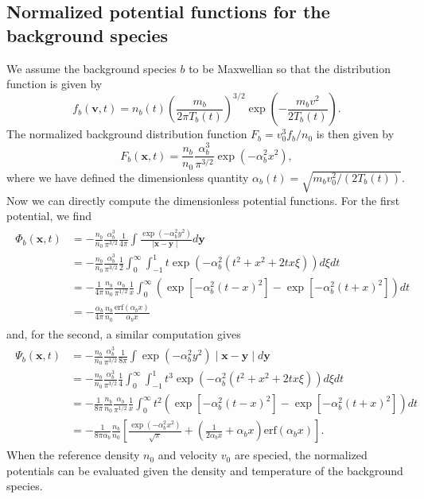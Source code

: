 \documentclass[preprint]{revtex4}
\newcommand{\erf}{\textrm{erf}}
\begin{document}
\subsection{Normalized potential functions for the background species}
We assume the background species $b$ to be Maxwellian so that the distribution function is given by
\begin{equation}
f_b(\bm{v},t)=n_b(t)\left(\frac{m_b}{2\pi T_b(t)}\right)^{3/2}\exp\left(-\frac{m_bv^2}{2T_b(t)}\right).
\end{equation}
The normalized background distribution function $F_b=v_0^3f_b/n_0$ is then given by
\begin{equation}
F_b(\bm{x},t)=\frac{n_b}{n_0}\frac{\alpha_b^3}{\pi^{3/2}}\exp\left(-\alpha_b^2x^2\right),
\end{equation}
where we have defined the dimensionless quantity $\alpha_b(t)=\sqrt{m_bv_0^2/(2 T_b(t))}$. Now we can directly compute the dimensionless potential functions. For the first potential, we find
\begin{align}
\begin{split}
\Phi_b(\bm{x},t)&=-\frac{n_b}{n_0}\frac{\alpha_b^3}{\pi^{3/2}}\frac{1}{4\pi}\int \frac{\exp\left(-\alpha_b^2y^2\right)}{\mid \bm{x}-\bm{y}\mid}d\bm{y}\\
&=-\frac{n_b}{n_0}\frac{\alpha_b^3}{\pi^{3/2}}\frac{1}{2}\int_{0}^{\infty}\int_{-1}^{1} t\exp\left(-\alpha_b^2(t^2+x^2+2tx\xi)\right)d\xi dt\\
&=-\frac{1}{4\pi}\frac{n_b}{n_0}\frac{\alpha_b}{\pi^{1/2}}\frac{1}{x}\int_0^{\infty}\left(\exp[-\alpha_b^2(t-x)^2]-\exp[-\alpha_b^2(t+x)^2]\right)dt\\
&=-\frac{\alpha_b}{4\pi}\frac{n_b}{n_0}\frac{\erf\left(\alpha_bx\right)}{\alpha_bx}
\end{split}
\end{align}
and, for the second, a similar computation gives
\begin{align}
\begin{split}
\Psi_b(\bm{x},t)&=-\frac{n_b}{n_0}\frac{\alpha_b^3}{\pi^{3/2}}\frac{1}{8\pi}\int \exp\left(-\alpha_b^2y^2\right)\mid \bm{x}-\bm{y}\mid d\bm{y}\\
&=-\frac{n_b}{n_0}\frac{\alpha_b^3}{\pi^{3/2}}\frac{1}{4}\int_{0}^{\infty}\int_{-1}^{1} t^3\exp\left(-\alpha_b^2(t^2+x^2+2tx\xi)\right)d\xi dt\\
&=-\frac{1}{8\pi}\frac{n_b}{n_0}\frac{\alpha_b}{\pi^{1/2}}\frac{1}{x}\int_0^{\infty}t^2\left(\exp[-\alpha_b^2(t-x)^2]-\exp[-\alpha_b^2(t+x)^2]\right)dt\\
&=-\frac{1}{8\pi\alpha_b}\frac{n_b}{n_0}\left[\frac{\exp(-\alpha_b^2x^2)}{\sqrt{\pi}}+\left(\frac{1}{2\alpha_bx}+\alpha_bx\right)\erf(\alpha_bx)\right].
\end{split}
\end{align}
When the reference density $n_0$ and velocity $v_0$ are specied, the normalized potentials can be evaluated given the density and temperature of the background species.
\end{document}
